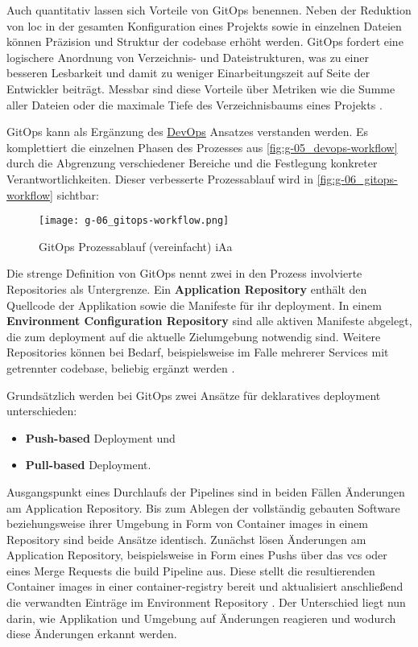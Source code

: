 Auch quantitativ lassen sich Vorteile von GitOps benennen. Neben der Reduktion von \Gls{loc} in der gesamten Konfiguration eines Projekts sowie in einzelnen Dateien können Präzision und Struktur der \Gls{codebase} erhöht werden. GitOps fordert eine logischere Anordnung von Verzeichnis- und Dateistrukturen, was zu einer besseren Lesbarkeit und damit zu weniger Einarbeitungszeit auf Seite der Entwickler beiträgt. Messbar sind diese Vorteile über Metriken wie die Summe aller Dateien oder die maximale Tiefe des Verzeichnisbaums eines Projekts \cite{008:GitOps-Approach-to-Cloud-Cluster-System-Deployment}.

GitOps kann als Ergänzung des \hyperref[sec:03-01_devops]{DevOps} Ansatzes verstanden werden. Es komplettiert die einzelnen Phasen des Prozesses aus \autoref{fig:g-05_devops-workflow} durch die Abgrenzung verschiedener Bereiche und die Festlegung konkreter Verantwortlichkeiten. Dieser verbesserte Prozessablauf wird in \autoref{fig:g-06_gitops-workflow} sichtbar:

\begin{figure}[h]
    \centering
    \texttt{[image: g-06\_gitops-workflow.png]}
    \caption{GitOps Prozessablauf (vereinfacht) \acrshort{iAa} \citeauthor{008:GitOps-Approach-to-Cloud-Cluster-System-Deployment}}
    \label{fig:g-06_gitops-workflow}
\end{figure}

Die strenge Definition von GitOps nennt zwei in den Prozess involvierte Repositories als Untergrenze. Ein \textbf{Application Repository} enthält den Quellcode der Applikation sowie die Manifeste für ihr \Gls{deployment}. In einem \textbf{Environment Configuration Repository} sind alle aktiven Manifeste abgelegt, die zum \Gls{deployment} auf die aktuelle Zielumgebung notwendig sind. Weitere Repositories können bei Bedarf, beispielsweise im Falle mehrerer Services mit getrennter \Gls{codebase}, beliebig ergänzt werden \cite{109:GitOps}.

Grundsätzlich werden bei GitOps zwei Ansätze für deklaratives \Gls{deployment} unterschieden:

\begin{itemize}
    \item \textbf{Push-based} Deployment und
    \item \textbf{Pull-based} Deployment.
\end{itemize}

Ausgangspunkt eines Durchlaufs der Pipelines sind in beiden Fällen Änderungen am Application Repository. Bis zum Ablegen der vollständig gebauten Software beziehungsweise ihrer Umgebung in Form von Container \Glspl{image} in einem Repository sind beide Ansätze identisch. Zunächst lösen Änderungen am Application Repository, beispielsweise in Form eines Pushs über das \Gls{vcs} oder eines Merge Requests die \Gls{build} Pipeline aus. Diese stellt die resultierenden Container \Glspl{image} in einer \Gls{container-registry} bereit und aktualisiert anschließend die verwandten Einträge im Environment Repository \cite{007:Analysis-of-Declarative-and-Pull-based-Deployment-Models-on-GitOps}. Der Unterschied liegt nun darin, wie Applikation und Umgebung auf Änderungen reagieren und wodurch diese Änderungen erkannt werden.

